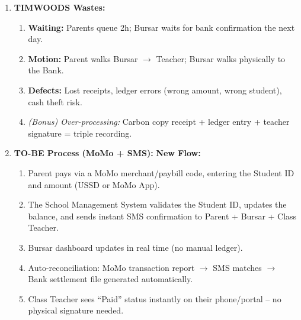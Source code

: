 \documentclass[11pt]{article}
\begin{document}
\begin{exoresolu}
\begin{enumerate}
\begin{itemize}
\begin{itemize}
            \item Bursar: Search Ledger $\to$ Write Receipt $\to$ Update Ledger $\to$ End-of-Day: Count Cash $\to$ Fill Deposit Slip $\to$ Walk to Bank.
            \item Class Teacher: Sign Receipt.
            \item Bank: Process Deposit (external Service Task).
        \end{itemize}
        \item \textbf{Gateways:} XOR at Bursar: ``Student found in ledger?'' [No $\to$ Manual search/Principal office]. XOR at Teacher: ``Receipt valid?'' [No $\to$ Reject].
        \item \textbf{End:} Parent has signed receipt; Bank deposit confirmed (next day).
    \end{itemize}
    \item \textbf{TIMWOODS Wastes:}
    \begin{enumerate}
        \item \textbf{Waiting:} Parents queue 2h; Bursar waits for bank confirmation the next day.
        \item \textbf{Motion:} Parent walks Bursar $\to$ Teacher; Bursar walks physically to the Bank.
        \item \textbf{Defects:} Lost receipts, ledger errors (wrong amount, wrong student), cash theft risk.
        \item \emph{(Bonus) Over-processing:} Carbon copy receipt + ledger entry + teacher signature = triple recording.
    \end{enumerate}
    \item \textbf{TO-BE Process (MoMo + SMS):}
    \textbf{New Flow:}
    \begin{enumerate}
        \item Parent pays via a MoMo merchant/paybill code, entering the Student ID and amount (USSD or MoMo App).
        \item The School Management System validates the Student ID, updates the balance, and sends instant SMS confirmation to Parent + Bursar + Class Teacher.
        \item Bursar dashboard updates in real time (no manual ledger).
        \item Auto-reconciliation: MoMo transaction report $\to$ SMS matches $\to$ Bank settlement file generated automatically.
        \item Class Teacher sees ``Paid'' status instantly on their phone/portal -- no physical signature needed.

\end{enumerate}
\end{enumerate}
\end{exoresolu}
\end{document}
